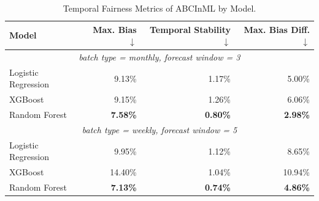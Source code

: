 \begin{table}
  \caption{Temporal Fairness Metrics of ABCInML by Model.}
  \label{tab:temporal-abcinml-models}
  \begin{tabular}{lrrr}
    \toprule
    Model & Max. Bias $\downarrow$ & Temporal Stability $\downarrow$ & Max. Bias Diff. $\downarrow$ \\
    \midrule
    \multicolumn{4}{c}{\textit{batch type = monthly, forecast window = 3}} \\
    \midrule
    Logistic Regression & 9.13\% & 1.17\% & 5.00\% \\
    XGBoost & 9.15\% & 1.26\% & 6.06\% \\
    Random Forest & \textbf{7.58\%} & \textbf{0.80\%} & \textbf{2.98\%} \\
    \midrule
    \multicolumn{4}{c}{\textit{batch type = weekly, forecast window = 5}} \\
    \midrule
    Logistic Regression & 9.95\% & 1.12\% & 8.65\% \\
    XGBoost & 14.40\% & 1.04\% & 10.94\% \\
    Random Forest & \textbf{7.13\%} & \textbf{0.74\%} & \textbf{4.86\%} \\
    \bottomrule
  \end{tabular}
\end{table}
